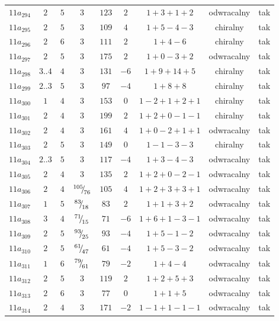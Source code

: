 \begin{longtable}{ccccccccc}
$11a_{294}$ & $2$ & $5$ & $3$ & $123$ & $2$ & $1+3+1+2$ & odwracalny & tak \\
$11a_{295}$ & $2$ & $5$ & $3$ & $109$ & $4$ & $1+5-4-3$ & chiralny & tak \\
$11a_{296}$ & $2$ & $6$ & $3$ & $111$ & $2$ & $1+4-6$ & chiralny & tak \\
$11a_{297}$ & $2$ & $5$ & $3$ & $175$ & $2$ & $1+0-3+2$ & odwracalny & tak \\
$11a_{298}$ & $3..4$ & $4$ & $3$ & $131$ & $-6$ & $1+9+14+5$ & chiralny & tak \\
$11a_{299}$ & $2..3$ & $5$ & $3$ & $97$ & $-4$ & $1+8+8$ & chiralny & tak \\
$11a_{300}$ & $1$ & $4$ & $3$ & $153$ & $0$ & $1-2+1+2+1$ & chiralny & tak \\
$11a_{301}$ & $2$ & $4$ & $3$ & $199$ & $2$ & $1+2+0-1-1$ & chiralny & tak \\
$11a_{302}$ & $2$ & $4$ & $3$ & $161$ & $4$ & $1+0-2+1+1$ & odwracalny & tak \\
$11a_{303}$ & $2$ & $5$ & $3$ & $149$ & $0$ & $1-1-3-3$ & chiralny & tak \\
$11a_{304}$ & $2..3$ & $5$ & $3$ & $117$ & $-4$ & $1+3-4-3$ & odwracalny & tak \\
$11a_{305}$ & $2$ & $4$ & $3$ & $135$ & $2$ & $1+2+0-2-1$ & odwracalny & tak \\
$11a_{306}$ & $2$ & $4$ & ${}^{105}{\mskip -5mu/\mskip -3mu}_{76}$ & $105$ & $4$ & $1+2+3+3+1$ & odwracalny & tak \\
$11a_{307}$ & $1$ & $5$ & ${}^{83}{\mskip -5mu/\mskip -3mu}_{18}$ & $83$ & $2$ & $1+1+3+2$ & odwracalny & tak \\
$11a_{308}$ & $3$ & $4$ & ${}^{71}{\mskip -5mu/\mskip -3mu}_{15}$ & $71$ & $-6$ & $1+6+1-3-1$ & odwracalny & tak \\
$11a_{309}$ & $2$ & $5$ & ${}^{93}{\mskip -5mu/\mskip -3mu}_{25}$ & $93$ & $-4$ & $1+5-1-2$ & odwracalny & tak \\
$11a_{310}$ & $2$ & $5$ & ${}^{61}{\mskip -5mu/\mskip -3mu}_{47}$ & $61$ & $-4$ & $1+5-3-2$ & odwracalny & tak \\
$11a_{311}$ & $1$ & $6$ & ${}^{79}{\mskip -5mu/\mskip -3mu}_{61}$ & $79$ & $-2$ & $1+4-4$ & odwracalny & tak \\
$11a_{312}$ & $2$ & $5$ & $3$ & $119$ & $2$ & $1+2+5+3$ & odwracalny & tak \\
$11a_{313}$ & $2$ & $6$ & $3$ & $77$ & $0$ & $1+1+5$ & odwracalny & tak \\
$11a_{314}$ & $2$ & $4$ & $3$ & $171$ & $-2$ & $1-1+1-1-1$ & odwracalny & tak \\

\end{longtable}
